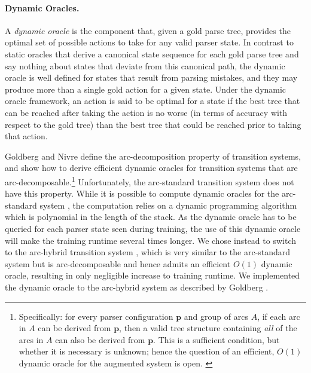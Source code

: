 \documentclass[11pt]{article}
\begin{document}
\paragraph{Dynamic Oracles.} A \emph{dynamic oracle} is the component that, given a gold parse tree, 
provides the optimal set of possible actions to take
for any valid parser state.  In contrast to static oracles that derive a
canonical state sequence for each gold parse tree and say nothing about
states that deviate from this canonical path, the dynamic
oracle is well defined for states that result from parsing
mistakes, and they may produce more than a single gold action for a given
state.  Under the dynamic oracle framework, an action is said to be
optimal for a state if the best tree that can be reached after taking the
action is no worse (in terms of accuracy with respect to the gold tree) than the
best tree that could be reached prior to taking that action.

Goldberg and Nivre  define the arc-decomposition
property of transition systems, and show how to derive efficient
dynamic oracles for transition systems that are arc-decomposable.\footnote{Specifically: 
for every parser configuration $\mathbf{p}$ and group of arcs $A$, if
each arc in $A$ can be derived from $\mathbf{p}$, then a valid tree structure
containing \emph{all} of the arcs in $A$ can also be derived from $\mathbf{p}$.
This is a sufficient condition, but whether it is necessary is
unknown; hence the question of an efficient, $O(1)$ dynamic oracle for the augmented system is open. \label{fn:arc-decomposition}}
Unfortunately,
the arc-standard transition system does not have this property.  While it is
possible to compute dynamic oracles for the arc-standard system
\cite{goldberg2013tabular}, the computation relies on a dynamic programming
algorithm which is polynomial in the length of the stack.
As the dynamic oracle has to be queried for each parser state seen during
training, the use of this dynamic oracle will make the training runtime
several times longer.
We chose instead to switch to the arc-hybrid transition system \cite{kuhlmann11dynamic}, 
which is very
similar to the arc-standard system but is arc-decomposable and hence admits an
efficient $O(1)$ dynamic oracle, resulting in only negligible increase
to training runtime.
We implemented the dynamic oracle to the arc-hybrid system as described by
Goldberg .
\end{document}
